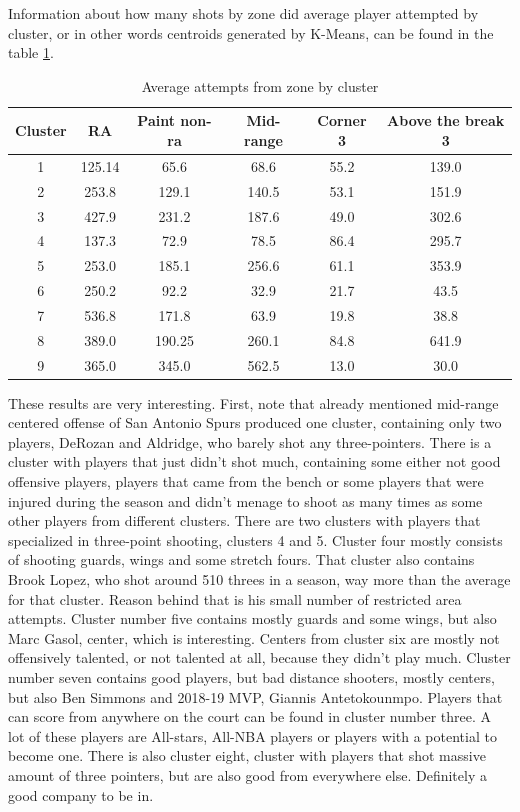 \documentclass[a4paper]{article}
\begin{document}
Information about how many shots by zone did average player attempted by cluster, or in other words centroids generated by K-Means, can be found in the table \ref{tab:avg_by_clst}.

\begin{table}[!h]
\begin{center}
\begin{tabular}{|c|c|c|c|c|c|} \hline
Cluster & RA & Paint non-ra & Mid-range & Corner 3 & Above the break 3 \\ \hline
1 & 125.14 &  65.6 & 68.6 &  55.2 & 139.0 \\ \hline
2 & 253.8 & 129.1 & 140.5 & 53.1 & 151.9 \\ \hline
3 & 427.9 & 231.2 & 187.6 &  49.0 & 302.6 \\ \hline
4 & 137.3 & 72.9 & 78.5 & 86.4 & 295.7 \\ \hline
5 & 253.0 & 185.1 & 256.6 & 61.1 & 353.9 \\ \hline
6 & 250.2 & 92.2 & 32.9 & 21.7 & 43.5 \\ \hline
7 & 536.8 & 171.8 & 63.9 & 19.8 & 38.8 \\ \hline
8 & 389.0 & 190.25 & 260.1 & 84.8 & 641.9 \\ \hline
9 & 365.0 & 345.0 & 562.5 & 13.0 & 30.0 \\ \hline
\end{tabular}
\caption{Average attempts from zone by cluster}
\label{tab:avg_by_clst}
\end{center}
\end{table}



These results are very interesting. First, note that already mentioned mid-range centered offense of San Antonio Spurs produced one cluster, containing only two players, DeRozan and Aldridge, who barely shot any three-pointers. There is a cluster with players that just didn't shot much, containing some either not good offensive players, players that came from the bench or some players that were injured during the season and didn't menage to shoot as many times as some other players from different clusters. There are two clusters with players that specialized in three-point shooting, clusters 4 and 5. Cluster four mostly consists of shooting guards, wings and some stretch fours. That cluster also contains Brook Lopez, who shot around 510 threes in a season, way more than the average for that cluster. Reason behind that is his small number of restricted area attempts. Cluster number five contains mostly guards and some wings, but also Marc Gasol, center, which is interesting.  Centers from cluster six are mostly not offensively talented, or not talented at all, because they didn't play much. Cluster number seven contains good players, but bad distance shooters, mostly centers, but also Ben Simmons and 2018-19 MVP, Giannis Antetokounmpo. Players that can score from anywhere on the court can be found in cluster number three. A lot of these players are All-stars, All-NBA players or players with a potential to become one. There is  also cluster eight, cluster with players that shot massive amount of three pointers, but are also good from everywhere else. Definitely a good company to be in.
\end{document}
